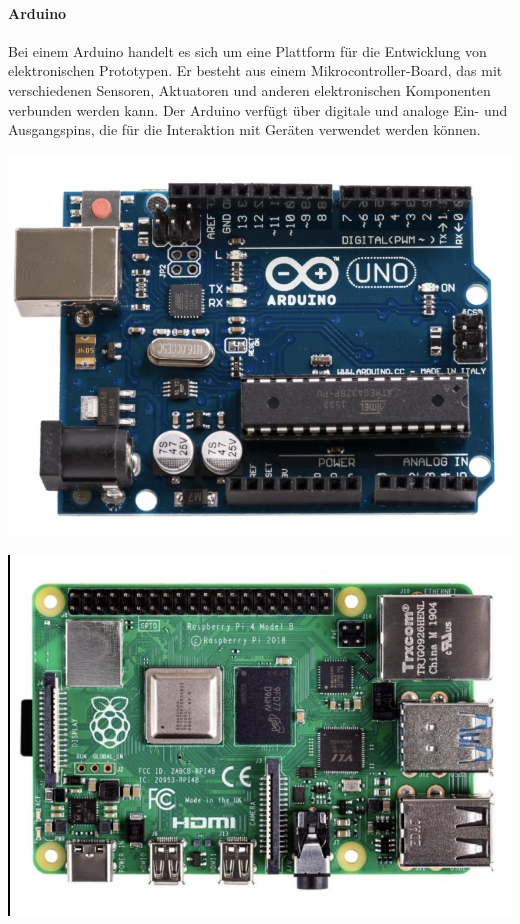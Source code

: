 \begin{enumerate}
\begin{minipage}{0.7\textwidth}
	\paragraph{Arduino}
	Bei einem Arduino handelt es sich um eine Plattform für die Entwicklung von elektronischen Prototypen.
	Er besteht aus einem Mikrocontroller-Board, das mit verschiedenen Sensoren, Aktuatoren und anderen elektronischen Komponenten verbunden werden kann.
	Der Arduino verfügt über digitale und analoge Ein- und Ausgangspins, die für die Interaktion mit Geräten verwendet werden können.
\end{minipage}
\begin{minipage}{0.3\textwidth}
	\includegraphics [width=\textwidth] {img/ArduinoR3}
\end{minipage}
\newline

\begin{minipage}{0.3\textwidth}
	\includegraphics [width=\textwidth] {img/RasperryPi}
\end{minipage}
\begin{minipage}{0.7\textwidth}

\end{minipage}
\end{enumerate}
